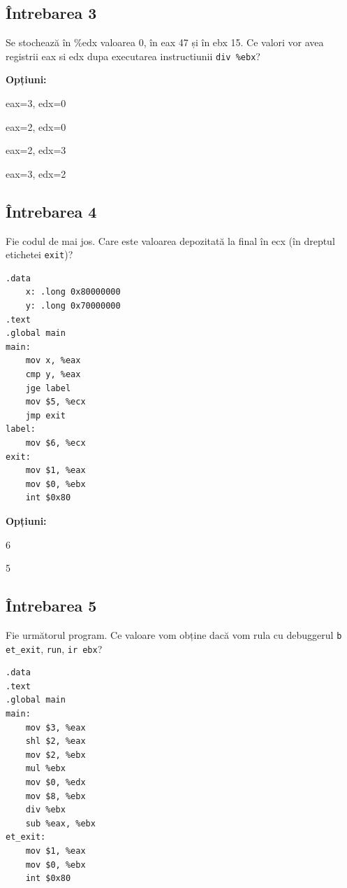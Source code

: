 \documentclass[12pt,a4paper]{article}
\begin{document}
\subsection*{Întrebarea 3}
Se stochează în \%edx valoarea 0, în eax 47 și în ebx 15. Ce valori vor avea registrii eax si edx dupa executarea instructiunii \texttt{div \%ebx}?

\textbf{Opțiuni:}
\begin{itemize*}
    \item eax=3, edx=0
    \item eax=2, edx=0
    \item eax=2, edx=3
    \item eax=3, edx=2
\end{itemize*}

\subsection*{Întrebarea 4}
Fie codul de mai jos. Care este valoarea depozitată la final în ecx (în dreptul etichetei \texttt{exit})?
\begin{lstlisting}[language=x86asm, caption={Cod Sursa (Lab 3.1)}]
.data
    x: .long 0x80000000
    y: .long 0x70000000
.text
.global main
main:
    mov x, %eax
    cmp y, %eax
    jge label
    mov $5, %ecx
    jmp exit
label:
    mov $6, %ecx
exit:
    mov $1, %eax
    mov $0, %ebx
    int $0x80
\end{lstlisting}

\textbf{Opțiuni:}
\begin{itemize*}
    \item 6
    \item 5
\end{itemize*}

\subsection*{Întrebarea 5}
Fie următorul program. Ce valoare vom obține dacă vom rula cu debuggerul \texttt{b et\_exit}, \texttt{run}, \texttt{ir ebx}?
\begin{lstlisting}[language=x86asm]
.data
.text
.global main
main:
    mov $3, %eax
    shl $2, %eax
    mov $2, %ebx
    mul %ebx
    mov $0, %edx
    mov $8, %ebx
    div %ebx
    sub %eax, %ebx
et_exit:
    mov $1, %eax
    mov $0, %ebx
    int $0x80
\end{lstlisting}
\end{document}
